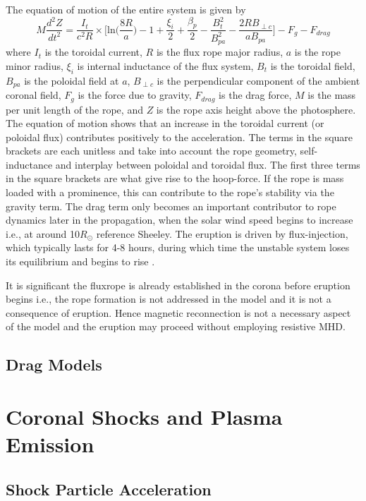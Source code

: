 The equation of motion of the entire system is given by
\begin{equation}
M\frac{d^2Z}{dt^2} = \frac{I_t}{c^2R}\times\bigg[ \mathrm{ln}\bigg(\frac{8R}{a}\bigg) -1+ \frac{\xi_i}{2} + \frac{\beta_p}{2} -\frac{B^2_t}{B^2_{pa}}  -\frac{2RB_{\perp c}}{aB_{pa}} \bigg] - F_g - F_{drag}
\end{equation}
where $I_t$ is the toroidal current, $R$ is the flux rope major radius, $a$ is the rope minor radius, $\xi_i$ is internal inductance of the flux system, $B_t$ is the toroidal field, $B_{pa}$ is the poloidal field at $a$, $B_{\perp c}$ is the perpendicular component of the ambient coronal field, $F_g$ is the force due to gravity, $F_{drag}$ is the drag force, $M$ is the mass per unit length of the rope, and $Z$ is the rope axis height above the photosphere. The equation of motion shows that an increase in the toroidal current (or poloidal flux) contributes positively to the acceleration. The terms in the square brackets are each unitless and take into account the rope geometry, self-inductance and interplay between poloidal and toroidal flux. The first three terms in the square brackets are what give rise to the hoop-force. If the rope is mass loaded with a prominence, this can contribute to the rope's stability via the gravity term. The drag term only becomes an important contributor to rope dynamics later in the propagation, when the solar wind speed begins to increase i.e., at around 10$R_{\odot}$ reference Sheeley. The eruption is driven by flux-injection, which typically lasts for 4-8 hours, during which time the unstable system loses its equilibrium and begins to rise \citet{krall2001}.

It is significant the fluxrope is already established in the corona before eruption begins i.e., the rope formation is not addressed in the model and it is not a consequence of eruption. Hence magnetic reconnection is not a necessary aspect of the model and the eruption may proceed without employing resistive MHD.


\subsection{Drag Models}\label{sec:23}


\section{Coronal Shocks and Plasma Emission}\label{sec:3}

\subsection{Shock Particle Acceleration}\label{sec:30}

